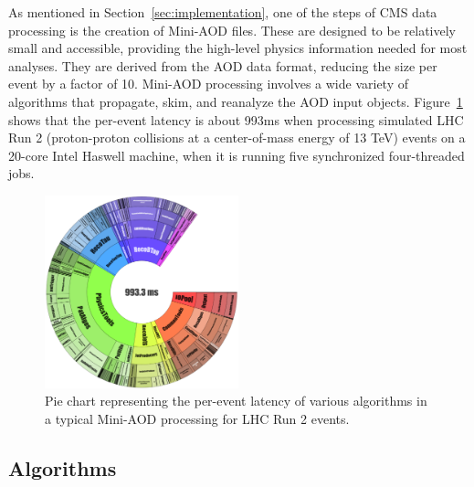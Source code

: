 

As mentioned in Section~\ref{sec:implementation}, one of the steps of CMS data processing is the creation of Mini-AOD files. These are designed to be relatively small and accessible, providing the high-level physics information needed for most analyses. They are derived from the AOD data format, reducing the size per event by a factor of 10.
Mini-AOD processing involves a wide variety of algorithms that propagate, skim, and reanalyze the AOD input objects. Figure~\ref{fig:algorithms} shows that the per-event latency is about 993\unit{ms} when processing simulated LHC Run 2  (proton-proton collisions at a center-of-mass energy of 13 TeV) \ttbar events on a 20-core Intel Haswell machine, when it is running five synchronized four-threaded jobs.

\begin{figure}[htp]
    \centering
    \includegraphics[width=0.50\textwidth]{plots/Step2_pieChart.pdf}
    \caption{Pie chart representing the per-event latency of various algorithms in a typical Mini-AOD processing for LHC Run 2 \ttbar events.}
    \label{fig:algorithms}
\end{figure}

\subsection{Algorithms}

